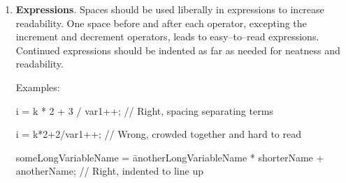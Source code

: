 \documentclass[11pt]{article}
\begin{document}
\begin{enumerate}
Example:

\begin{tt}
\begin{tabbing}
aa\=aa\=aa\=aa\= \kill
void Function1(int arg1, double arg2)\\
\{               // Right, curly brace at column 0\\
int local1 = 0;  // Right, local variable at column 0\\
int local2;\\
\>\\
\>local2 = local1 + arg1 + arg2;   // Right, indented two columns\\
\>int local3;                      // Right, variable at same level\\
\>local3 = Function2(local2);\\
\>if (someCondition)\\
\>\>\{\\
\>\>\>local3 = 0;\\
\>\>\>local2 = local1;\\
\>\>\>int local4 = local1 + 1;     // Right, variable at same level\\
\>\>\>Function3(local4);\\
\>\>\}\\
\}               // Right, close brace at column 0
\end{tabbing}
\end{tt}

\item {\bf Expressions}.  Spaces should be used liberally in expressions
to increase readability.  One space before and after each operator,
excepting the increment and decrement operators, leads to easy--to--read
expressions.  Continued expressions should be indented as far as needed
for neatness and readability.

Examples:

\begin{tt}
i = k * 2 + 3 / var1++;  // Right, spacing separating terms \\
\end{tt}

\begin{tt}
i = k*2+2/var1++;        // Wrong, crowded together and hard to read
\end{tt}

\begin{tt}
\begin{tabbing}
someLongVariableName = \=anotherLongVariableName * shorterName + \\
\>anotherName;  // Right, indented to line up
\end{tabbing}
\end{tt}

\end{enumerate}
\end{document}

